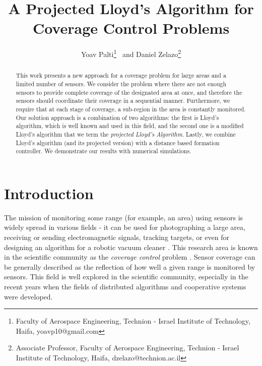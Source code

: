 \documentclass{iacas}
\begin{document}

\title{A Projected Lloyd's Algorithm for Coverage Control Problems}

\author{%
  Yoav Palti\thanks{Faculty of Aerospace Engineering, Technion - Israel Institute of Technology, Haifa, yoavp10@gmail.com}
  \ and
  Daniel Zelazo\thanks{Associate Professor, Faculty of Aerospace Engineering, Technion - Israel Institute of Technology, Haifa, dzelazo@technion.ac.il}
}

\maketitle

\begin{abstract}
This work presents a new approach for a coverage problem for large areas and a limited number of sensors. We consider the problem where there are not enough sensors to provide complete coverage of the designated area at once, and therefore the sensors should coordinate their coverage in a sequential manner. Furthermore, we require that at each stage of coverage, a sub-region in the area is constantly monitored. Our solution approach is a combination of two algorithms: the first is Lloyd's algorithm, which is well known and used in this field, and the second one is a modified Lloyd's algorithm that we term the \emph{projected Lloyd's Algorithm}. Lastly, we combine Lloyd's algorithm (and its projected version) with a distance based formation controller. We demonstrate our results with numerical simulations.
\end{abstract}

\section{Introduction}

The mission of monitoring some range (for example, an area) using sensors is widely spread in various fields - it can be used for photographing a large area, receiving or sending electromagnetic signals, tracking targets, or even for designing an algorithm for a robotic vacuum cleaner \cite{Nigam2012, 7798796, 7798244}.
%
This research area is known in the scientific community as the \emph{coverage control} problem \cite{Cassandras2005}. Sensor coverage can be generally described as the reflection of how well a given range is monitored by sensors. This field is well explored in the scientific community, especially in the recent years when the fields of distributed algorithms and cooperative systems were developed.
\end{document}
